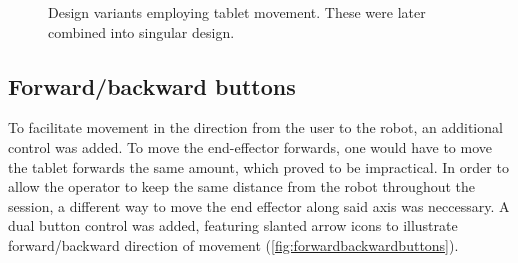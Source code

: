 \begin{figure}[H]
    \centering
    
    
    \caption{Design variants employing tablet movement. These were later combined into singular design.}
    \label{fig:EarlyDesigns2}
\end{figure}

\subsection{Forward/backward buttons}

To facilitate movement in the direction from the user to the robot, an additional control was added. To move the end-effector forwards, one would have to move the tablet forwards the same amount, which proved to be impractical. In order to allow the operator to keep the same distance from the robot throughout the session, a different way to move the end effector along said axis was neccessary. A dual button control was added, featuring slanted arrow icons to illustrate forward/backward direction of movement (\ref{fig:forwardbackwardbuttons}). 

